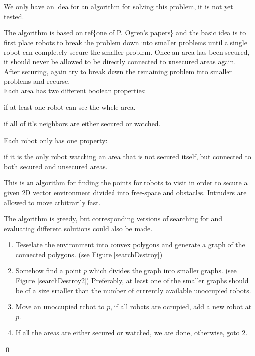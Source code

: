 We only have an idea for an algorithm for solving this problem, it is not yet tested.

The algorithm is based on ref\{one of P. Ögren's papers\} and the basic idea is to first place robots to break the problem down into smaller problems until a single robot can completely secure the smaller problem.
Once an area has been secured, it should never be allowed to be directly connected to unsecured areas again.
After securing, again try to break down the remaining problem into smaller problems and recurse.\\

Each area has two different boolean properties:
\begin{definition}[Watched]
if at least one robot can see the whole area.
\end{definition}
\begin{definition}[Secured]
if all of it's neighbors are either secured or watched.
\end{definition}

Each robot only has one property:
\begin{definition}[Occupied]
if it is the only robot watching an area that is not secured itself, but connected to both secured and unsecured areas.
\end{definition}

\begin{algorithm}
This is an algorithm for finding the points for robots to visit in order to secure a given 2D vector environment divided into free-space and obstacles. Intruders are allowed to move arbitrarily fast.

The algorithm is greedy, but corresponding versions of searching for and evaluating different solutions could also be made.
\begin{enumerate}
	\item Tesselate the environment into convex polygons and generate a graph of the connected polygons. (see Figure \ref{searchDestroy})
	\item Somehow find a point $p$ which divides the graph into smaller graphs. (see Figure \ref{searchDestroy2})
			Preferably, at least one of the smaller graphs should be of a size smaller than the number of currently available unoccupied robots.
	\item Move an unoccupied robot to $p$, if all robots are occupied, add a new robot at $p$.
	\item If all the areas are either secured or watched, we are done, otherwise, goto 2.
\end{enumerate}
\qed
\label{algSearchDestroyIdea}
\end{algorithm}

